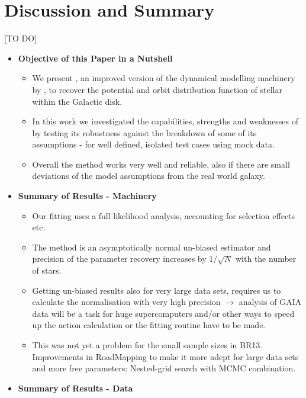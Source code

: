 \section{Discussion and Summary}

[TO DO]

\begin{itemize}

\item \textbf{Objective of this Paper in a Nutshell}
\begin{itemize}
\item We present \RM, an improved version of the dynamical modelling machinery by \citet{bov13}, to recover the potential and orbit distribution function of stellar \MAPs within the Galactic disk.
\item In this work we investigated the capabilities, strengths and weaknesses of \RM by testing its robustness against the breakdown of some of its assumptions - for well defined, isolated test cases using mock data.
\item Overall the method works very well and reliable, also if there are small deviations of the model assumptions from the real world galaxy.
\end{itemize}

\item \textbf{Summary of Results - Machinery}

\begin{itemize}
\item Our fitting uses a full likelihood analysis, accounting for selection effects etc.
\item The method is an asymptotically normal un-biased estimator and precision of the parameter recovery increases by $1/\sqrt{N}$ with the number of stars.
\item Getting un-biased results also for very large data sets, requires us to calculate the normalisation with very high precision $\longrightarrow$ analysis of GAIA data will be a task for huge supercomputers and/or other ways to speed up the action calculation or the fitting routine have to be made.
\item This was not yet a problem for the small sample sizes in BR13. Improvements in RoadMapping to make it more adept for large data sets and more free parameters: Nested-grid search with MCMC combination.
\end{itemize}

\item \textbf{Summary of Results - Data}


\end{itemize}

